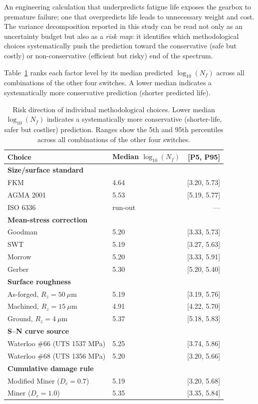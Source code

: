 \documentclass[twocolumn,12pt,a4paper]{article}
\begin{document}
An engineering calculation that underpredicts fatigue life exposes the
gearbox to premature failure; one that overpredicts life leads to
unnecessary weight and cost. The variance decomposition reported in
this study can be read not only as an uncertainty budget but also as a
\emph{risk map}: it identifies which methodological choices
systematically push the prediction toward the conservative (safe but
costly) or non-conservative (efficient but risky) end of the spectrum.

Table~\ref{tab:risk} ranks each factor level by its median predicted
$\log_{10}(N_f)$ across all combinations of the other four switches.
A lower median indicates a systematically more conservative prediction
(shorter predicted life).

\begin{table}[ht]
\centering
\caption{Risk direction of individual methodological choices. Lower
median $\log_{10}(N_f)$ indicates a systematically more conservative
(shorter-life, safer but costlier) prediction. Ranges show the 5th
and 95th percentiles across all combinations of the other four
switches.\label{tab:risk}}
\footnotesize
\begin{tabular}{llr}
\toprule
Choice & Median $\log_{10}(N_f)$ & [P5, P95] \\
\midrule
\multicolumn{3}{l}{\textbf{Size/surface standard}} \\
  FKM & 4.64 & [3.20, 5.73] \\
  AGMA 2001 & 5.53 & [5.19, 5.77] \\
  ISO 6336 & run-out & --- \\
\midrule
\multicolumn{3}{l}{\textbf{Mean-stress correction}} \\
  Goodman & 5.20 & [3.33, 5.73] \\
  SWT & 5.19 & [3.27, 5.63] \\
  Morrow & 5.20 & [3.33, 5.91] \\
  Gerber & 5.30 & [5.20, 5.40] \\
\midrule
\multicolumn{3}{l}{\textbf{Surface roughness}} \\
  As-forged, $R_z=50~\mu$m & 5.19 & [3.19, 5.76] \\
  Machined, $R_z=15~\mu$m & 4.91 & [4.22, 5.70] \\
  Ground, $R_z=4~\mu$m & 5.37 & [5.18, 5.83] \\
\midrule
\multicolumn{3}{l}{\textbf{S--N curve source}} \\
  Waterloo \#66 (UTS 1537 MPa) & 5.25 & [3.74, 5.86] \\
  Waterloo \#68 (UTS 1356 MPa) & 5.20 & [3.20, 5.66] \\
\midrule
\multicolumn{3}{l}{\textbf{Cumulative damage rule}} \\
  Modified Miner ($D_c=0.7$) & 5.19 & [3.20, 5.68] \\
  Miner ($D_c=1.0$) & 5.35 & [3.35, 5.84] \\
\bottomrule
\end{tabular}
\end{table}
\end{document}
